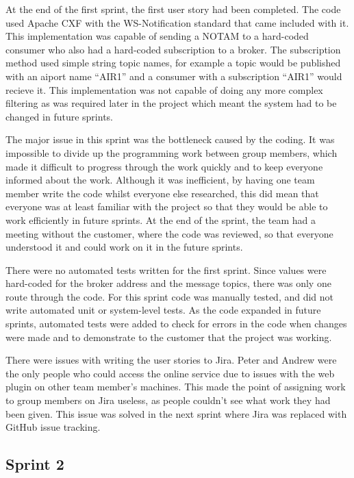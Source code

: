 \documentclass[a4paper, 12pt, twoside]{article}
\begin{document}
At the end of the first sprint, the first user story had been completed. The code used Apache CXF with the WS-Notification standard that came included with it. This implementation was capable of sending a NOTAM to a hard-coded consumer who also had a hard-coded subscription to a broker. The subscription method used simple string topic names, for example a topic would be published with an aiport name ``AIR1'' and a consumer with a subscription ``AIR1'' would recieve it. This implementation was not capable of doing any more complex filtering as was required later in the project which meant the system had to be changed in future sprints.

The major issue in this sprint was the bottleneck caused by the coding. It was impossible to divide up the programming work between group members, which made it difficult to progress through the work quickly and to keep everyone informed about the work. Although it was inefficient, by having one team member write the code whilst everyone else researched, this did mean that everyone was at least familiar with the project so that they would be able to work efficiently in future sprints. At the end of the sprint, the team had a meeting without the customer, where the code was reviewed, so that everyone understood it and could work on it in the future sprints.

There were no automated tests written for the first sprint. Since values were hard-coded for the broker address and the message topics, there was only one route through the code. For this sprint code was manually tested, and did not write automated unit or system-level tests. As the code expanded in future sprints, automated tests were added to check for errors in the code when changes were made and to demonstrate to the customer that the project was working.

There were issues with writing the user stories to Jira. Peter and Andrew were the only people who could access the online service due to issues with the web plugin on other team member's machines. This made the point of assigning work to group members on Jira useless, as people couldn't see what work they had been given. This issue was solved in the next sprint where Jira was replaced with GitHub issue tracking.

\subsection{Sprint 2}
\label{sec:impl_sprint_2}
\end{document}

